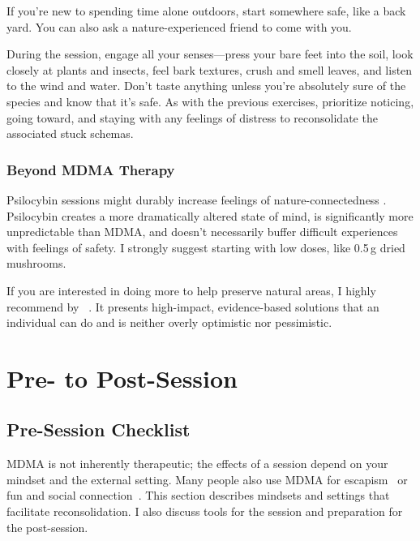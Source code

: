 \documentclass[11pt,oneside]{book}
\let\cite\parencite
\newcommand{\prosecite}[1]{\citetitle{#1} by \citefullauthor{#1}~\cite{#1}}
\begin{document}
If you're new to spending time alone outdoors, start somewhere safe, like a back yard. You can also ask a nature-experienced friend to come with you.

During the session, engage all your senses---press your bare feet into the soil, look closely at plants and insects, feel bark textures, crush and smell leaves, and listen to the wind and water. Don't taste anything unless you're absolutely sure of the species and know that it's safe. As with the previous exercises, prioritize noticing, going toward, and staying with any feelings of distress to reconsolidate the associated stuck schemas.

\subsection*{Beyond MDMA Therapy}
Psilocybin sessions might durably increase feelings of nature-connectedness \cite{forstmannPsilocybinNature}. Psilocybin creates a more dramatically altered state of mind, is significantly more unpredictable than MDMA, and doesn't necessarily buffer difficult experiences with feelings of safety. I strongly suggest starting with low doses, like 0.5\,g dried mushrooms.

If you are interested in doing more to help preserve natural areas, I highly recommend \prosecite{ritchie2024not}. It presents high-impact, evidence-based solutions that an individual can do and is neither overly optimistic nor pessimistic.

\chapter{Pre- to Post-Session}
\section{Pre-Session Checklist}
\label{prep}
MDMA is not inherently therapeutic; the effects of a session depend on your mindset and the external setting. Many people also use MDMA for escapism~\cite{moonzweEscapism} or fun and social connection~\cite{huntPleasure}. This section describes mindsets and settings that facilitate reconsolidation. I also discuss tools for the session and preparation for the post-session.
\end{document}
